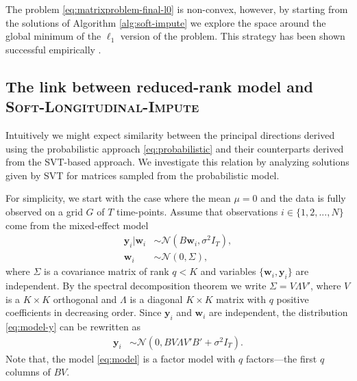 \documentclass[preprint]{imsart}
\numberwithin{equation}{section}
\theoremstyle{plain}
\newcommand{\cN}{\mathcal{N}}
\newcommand{\by}{\mathbf{y}}
\newcommand{\bw}{\mathbf{w}}
\begin{document}
The problem \eqref{eq:matrixproblem-final-l0} is non-convex, however, by starting from the solutions of Algorithm \ref{alg:soft-impute} we explore the space around the global minimum of the $\ell_1$ version of the problem. This strategy has been shown successful empirically \citep{ge2016matrix}.


\subsection{The link between reduced-rank model and \textsc{Soft-Longitudinal-Impute}}\label{s:the-link}


Intuitively we might expect similarity between the principal directions derived using the probabilistic approach \eqref{eq:probabilistic} and their counterparts derived from the SVT-based approach. We investigate this relation by analyzing solutions given by SVT for matrices sampled from the probabilistic model.

For simplicity, we start with the case where the mean $\mu = 0$ and the data is fully observed on a grid $G$ of $T$ time-points. Assume that observations $i \in \{1,2,...,N\}$ come from the mixed-effect model
\begin{align}
  \by_i | \bw_i &\sim \cN( B \bw_i, \sigma^2 I_T), \label{eq:model-y}\\
  \bw_i &\sim \cN(0 , \Sigma), \nonumber%
\end{align}
%
where $\Sigma$ is a covariance matrix of rank $q < K$ and variables $\{\bw_i, \by_i\}$ are independent. By the spectral decomposition theorem we write $\Sigma = V\Lambda V'$, where $V$ is a $K\times K$ orthogonal and $\Lambda$ is a diagonal $K\times K$ matrix with $q$ positive coefficients in decreasing order.
Since $\by_i$ and $\bw_i$ are independent, the distribution \eqref{eq:model-y} can be rewritten as
\begin{align}
  \by_i &\sim \cN(0, B V \Lambda V'  B' + \sigma^2 I_T). \label{eq:model}
\end{align}
Note that, the model \eqref{eq:model} is a factor model with $q$ factors---the first $q$ columns of $BV$.
\end{document}
